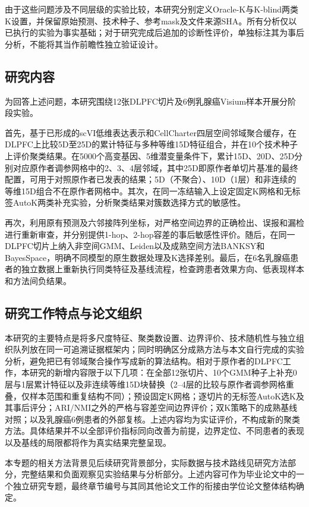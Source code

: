 由于这些问题涉及不同层级的实验比较，本研究分别定义Oracle-K与K-blind两类K设置，并保留原始预测、技术种子、参考mask及文件来源SHA。所有分析仅以已执行的实验为事实基础；对于研究完成后追加的诊断性评价，单独标注其为事后分析，不能将其当作前瞻性独立验证设计。

\subsection{研究内容}
为回答上述问题，本研究围绕12张DLPFC切片及6例乳腺癌Visium样本开展分阶段实验。

首先，基于已形成的scVI低维表达表示和CellCharter四层空间邻域聚合缓存，在DLPFC上比较5D至25D的累计特征与多种等维15D特征组合，并在10个技术种子上评价聚类结果。在5000个高变基因、5维潜变量条件下，累计15D、20D、25D分别对应原作者调参网格中的2、3、4层邻域，其中25D即原作者单切片基准的最终配置，可用于对照原作者已发表的结果；5D（不聚合）、10D（1层）和非连续的等维15D组合不在原作者网格中。其次，在同一冻结输入上设定固定K网格和无标签AutoK两类补充实验，分析聚类结果对簇数选择方式的敏感性。

再次，利用原有预测及六邻接阵列坐标，对严格空间边界的正确检出、误报和漏检进行重新审查，并分别提供1-hop、2-hop容差的事后敏感性评价。随后，在同一DLPFC切片上纳入非空间GMM、Leiden以及成熟空间方法BANKSY和BayesSpace，明确不同模型的原生数据处理及K选择差别。最后，在6名乳腺癌患者的独立数据上重新执行同类特征及基线流程，检查跨患者效果方向、低表现样本和方法间负结果。

\subsection{研究工作特点与论文组织}
本研究的主要特点是将多尺度特征、聚类数设置、边界评价、技术随机性与独立组织队列放在同一可追溯证据框架内；同时明确区分成熟方法与本文自行完成的实验分析，避免把已有邻域聚合操作写成新的算法结构。相对于原作者的DLPFC工作，本研究的新增内容限于以下几项：在全部12张切片、10个GMM种子上补充0层与1层累计特征以及非连续等维15D块替换（2--4层的比较与原作者调参网格重叠，仅样本范围和重复结构不同）；预设固定K网格；逐切片的无标签AutoK选K及其事后评分；ARI/NMI之外的严格与容差空间边界评价；双K策略下的成熟基线对照；以及乳腺癌6例患者的外部复核。上述内容均为实证评价，不构成新的聚类方法。具体结果并不以全部评价指标同向改善为前提，边界定位、不同患者的表现以及基线的局限都将作为真实结果完整呈现。

本专题的相关方法背景见后续研究背景部分，实际数据与技术路线见研究方法部分，完整结果和负面观察见实验结果与分析部分。上述内容可作为毕业论文中的一个独立研究专题，最终章节编号与其同其他论文工作的衔接由学位论文整体结构确定。
